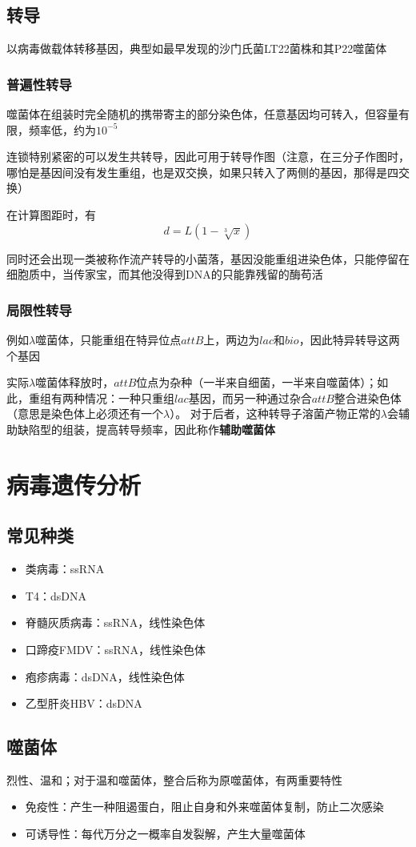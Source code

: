 \documentclass[a4paper, 12pt]{report}
\begin{document}
\section{转导}
以病毒做载体转移基因，典型如最早发现的沙门氏菌LT22菌株和其P22噬菌体
\subsection{普遍性转导}
噬菌体在组装时完全随机的携带寄主的部分染色体，任意基因均可转入，但容量有限，频率低，约为\(10^{-5}\)

连锁特别紧密的可以发生共转导，因此可用于转导作图（注意，在三分子作图时，哪怕是基因间没有发生重组，也是双交换，如果只转入了两侧的基因，那得是四交换）

在计算图距时，有
\[
    d=L(1-\sqrt[3]{x})
\]

同时还会出现一类被称作流产转导的小菌落，基因没能重组进染色体，只能停留在细胞质中，当传家宝，而其他没得到DNA的只能靠残留的酶苟活
\subsection{局限性转导}
例如\(\lambda\)噬菌体，只能重组在特异位点\(attB\)上，两边为\(lac\)和\(bio\)，因此特异转导这两个基因

实际\(\lambda\)噬菌体释放时，\(attB\)位点为杂种（一半来自细菌，一半来自噬菌体）；如此，重组有两种情况：一种只重组\(lac\)基因，而另一种通过杂合\(attB\)整合进染色体（意思是染色体上必须还有一个\(\lambda\)）。
对于后者，这种转导子溶菌产物正常的\(\lambda\)会辅助缺陷型的组装，提高转导频率，因此称作\textbf{辅助噬菌体}
\chapter{病毒遗传分析}
\section{常见种类}
\begin{itemize}
    \item 类病毒：ssRNA
    \item T4：dsDNA
    \item 脊髓灰质病毒：ssRNA，线性染色体
    \item 口蹄疫FMDV：ssRNA，线性染色体
    \item 疱疹病毒：dsDNA，线性染色体
    \item 乙型肝炎HBV：dsDNA
\end{itemize}
\section{噬菌体}
烈性、温和；对于温和噬菌体，整合后称为原噬菌体，有两重要特性
\begin{itemize}
    \item 免疫性：产生一种阻遏蛋白，阻止自身和外来噬菌体复制，防止二次感染
    \item 可诱导性：每代万分之一概率自发裂解，产生大量噬菌体
\end{itemize}
\end{document}
